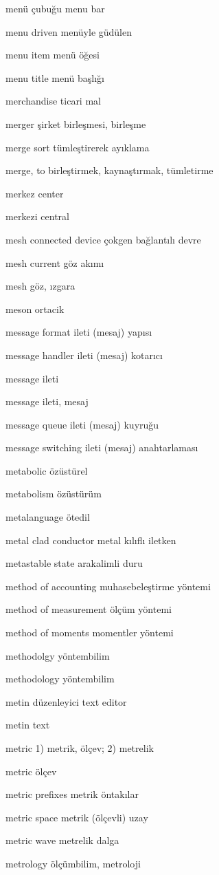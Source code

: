 \documentclass[12pt,fleqn]{article}\usepackage{../../common}
\begin{document}
menü çubuğu menu bar

menu driven menüyle güdülen

menu item menü öğesi

menu title menü başlığı

merchandise ticari mal

merger şirket birleşmesi, birleşme

merge sort tümleştirerek ayıklama

merge, to birleştirmek, kaynaştırmak, tümletirme

merkez center

merkezi central

mesh connected device çokgen bağlantılı devre

mesh current göz akımı

mesh göz, ızgara

meson ortacik

message format ileti (mesaj) yapısı

message handler ileti (mesaj) kotarıcı

message ileti

message ileti, mesaj

message queue ileti (mesaj) kuyruğu

message switching ileti (mesaj) anahtarlaması

metabolic özüstürel

metabolism özüstürüm

metalanguage ötedil

metal clad conductor metal kılıflı iletken

metastable state arakalimli duru

method of accounting muhasebeleştirme yöntemi

method of measurement ölçüm yöntemi

method of moments momentler yöntemi

methodolgy yöntembilim

methodology yöntembilim

metin düzenleyici text editor

metin text

metric 1) metrik, ölçev; 2) metrelik

metric ölçev

metric prefixes metrik öntakılar

metric space metrik (ölçevli) uzay

metric wave metrelik dalga

metrology ölçümbilim, metroloji
\end{document}
